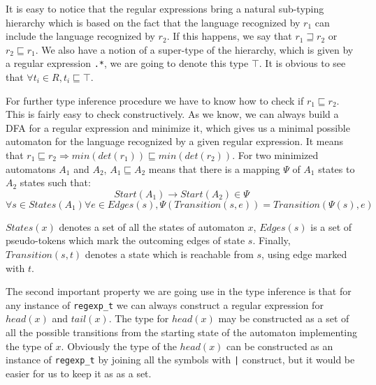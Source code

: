 \documentclass{article}
\begin{document}
It is easy to notice that the regular expressions bring a natural
sub-typing hierarchy which is based on the fact that the language
recognized by $r_1$ can include the language recognized by $r_2$.
If this happens, we say that $r_1 \sqsupseteq r_2$ or 
$r_2 \sqsubseteq r_1$.  We also have a notion of a super-type of
the hierarchy, which is given by a regular expression \verb|.*|,
we are going to denote this type $\top$.  It is obvious to see that
$\forall t_i \in R, t_i \sqsubseteq \top$.

For further type inference procedure we have to know how to check
if $r_1 {\sqsubseteq} r_2$.  This is fairly easy to
check constructively.  As we know, we can always build a DFA for
a regular expression and minimize it, which gives us a minimal
possible automaton for the language recognized by a given regular
expression.  It means that $r_1 \sqsubseteq r_2 \Rightarrow 
min (det (r_1)) \sqsubseteq min (det (r_2))$.  For two minimized 
automatons $A_1$ and $A_2$, $A_1 \sqsubseteq A_2$ means that there
is a mapping $\Psi$ of $A_1$ states to $A_2$ states such that:
\[
    Start (A_1) \to Start (A_2) \in \Psi
\]
\[
    \forall s \in States (A_1) \forall e \in Edges (s),
    \Psi (Transition (s, e)) = Transition (\Psi (s), e)
\]

$States (x)$ denotes a set of all the states of automaton $x$,
$Edges (s)$ is a set of pseudo-tokens which mark the outcoming
edges of state $s$.  Finally, $Transition (s, t)$ denotes a
state which is reachable from $s$, using edge marked with $t$.

The second important property we are going use in the type
inference is that for any instance of \texttt{regexp\_t} we
can always construct a regular expression for $head (x)$ and
$tail (x)$.  The type for $head (x)$ may be constructed as a
set of all the possible transitions from the starting state 
of the automaton implementing the type of $x$.  Obviously the
type of the $head (x)$ can be constructed as an instance of
\texttt{regexp\_t} by joining all the symbols with \verb/|/
construct, but it would be easier for us to keep it as as
a set.
\end{document}
